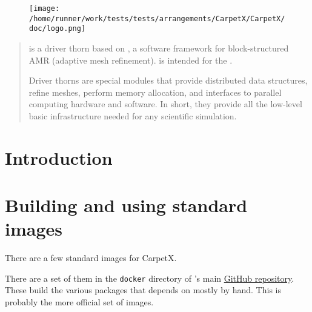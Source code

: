 \begin{figure*}[ht]
    \begin{center}
        \texttt{[image: /home/runner/work/tests/tests/arrangements/CarpetX/CarpetX/doc/logo.png]}
    \end{center}
    \label{fig:logo}
\end{figure*}

\newpage

\begin{abstract}

\CarpetX\space is a \href{https://www.cactuscode.org/index.html}{\Cactus} driver thorn based on \href{https://amrex-codes.github.io/}{\AMReX}, a software framework for block-structured AMR (adaptive mesh refinement). \CarpetX\space is intended for the \href{https://einsteintoolkit.org/}{\ETK}.

Driver thorns are special modules that provide distributed data structures, refine meshes, perform memory allocation, and interfaces to parallel computing hardware and software. In short, they provide all the low-level basic infrastructure needed for any scientific simulation.

\end{abstract}

\newpage

\tableofcontents

\newpage

\section{Introduction}
\label{sec:intro}


\section{Building and using standard images}
\label{sec:std_imgs}

There are a few standard images for CarpetX.

There are a set of them in the \texttt{docker} directory of \CarpetX's main \href{https://github.com/eschnett/CarpetX}{GitHub repository}. These build the various packages that \CarpetX\space depends on mostly by hand. This is probably the more official set of images.

